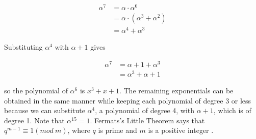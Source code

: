\documentclass[../main.tex]{subfiles}
\begin{document}
    \begin{align*}
        \alpha^7 &= \alpha \cdot \alpha^6 \\
                 &= \alpha \cdot (\alpha^3 + \alpha^2) \\
                 &= \alpha^4 + \alpha^3
    \end{align*}

    \noindent
    Substituting $\alpha^4$ with $\alpha + 1$ gives

    \begin{align*}
        \alpha^7 &= \alpha + 1 + \alpha^3 \\
                 &= \alpha^3 + \alpha + 1
    \end{align*}

     \noindent
    so the polynomial of $\alpha^6$ is $x^3 + x + 1$. The remaining exponentials can be obtained in the same manner while keeping each polynomial of degree 3 or less because we can substitute $\alpha^4$, a polynomial of degree 4, with $\alpha + 1$, which is of degree 1. Note that $\alpha^{15} = 1$. Fermats's Little Theorem says that $q^{m - 1} \equiv 1 (mod\ m)$, where $q$ is prime and $m$ is a positive integer \autocite{blahut1983theory} \autocite{bossert1999channel}.
\end{document}
